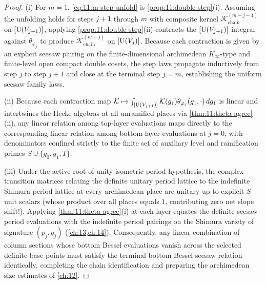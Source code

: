 \begin{proof}
(i) For $m = 1$, \eqref{eq:11:m-step-unfold} is \cref{prop:11:double-step}(i). Assuming the unfolding holds for steps $j+1$ through $m$ with composite kernel $\mathcal{K}_{\mathrm{chain}}^{(m - j - 1)}$ on $[\mathrm{U}(V_{j+1})]$, applying \cref{prop:11:double-step}(ii) contracts the $[\mathrm{U}(V_{j+1})]$-integral against $\theta_{\varphi_j}$ to produce $\mathcal{K}_{\mathrm{chain}}^{(m - j)}$ on $[\mathrm{U}(V_j)]$. Because each contraction is given by an explicit seesaw pairing on the finite-dimensional archimedean $K_\infty$-type and finite-level open compact double cosets, the step laws propagate inductively from step $j$ to step $j+1$ and close at the terminal step $j = m$, establishing the uniform seesaw family laws.

(ii) Because each contraction map $\mathcal{K} \mapsto \int_{[\mathrm{U}(V_{j+1})]} \mathcal{K}(g_1)\theta_{\varphi_j}(g_1, \cdot)\, dg_1$ is linear and intertwines the Hecke algebras at all unramified places via \cref{thm:11:theta-agree}(ii), any linear relation among top-layer evaluations maps directly to the corresponding linear relation among bottom-layer evaluations at $j = 0$, with denominators confined strictly to the finite set of auxiliary level and ramification primes $S \cup \{g_0, g_1, T\}$.

(iii) Under the active root-of-unity isometric period hypothesis, the complex transition matrices relating the definite unitary period lattice to the indefinite Shimura period lattice at every archimedean place are unitary up to explicit $S$-unit scalars (whose product over all places equals $1$, contributing zero net slope shift!). Applying \cref{thm:11:theta-agree}(i) at each layer equates the definite seesaw period evaluations with the indefinite period pairings on the Shimura variety of signature $(p_j, q_j)$ (\cref{ch:13,ch:14}). Consequently, any linear combination of column sections whose bottom Bessel evaluations vanish across the selected definite-base points must satisfy the terminal bottom Bessel seesaw relation identically, completing the chain identification and preparing the archimedean size estimates of \cref{ch:12}.
\end{proof}
